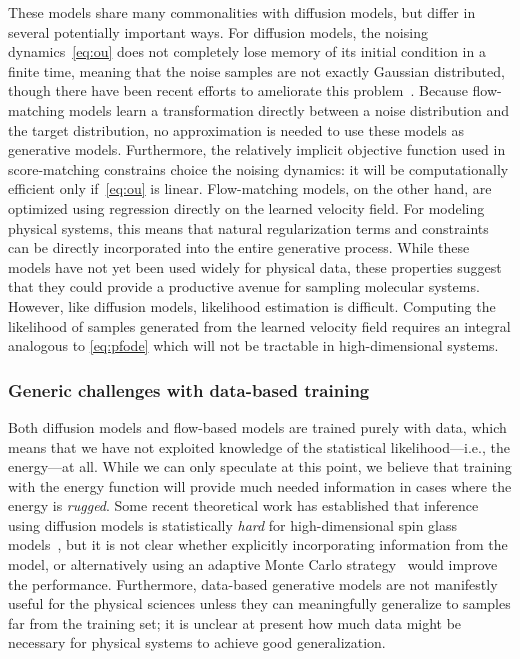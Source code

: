 \documentclass[11pt]{article}
\begin{document}
These models share many commonalities with diffusion models, but differ in several potentially important ways.
For diffusion models, the noising dynamics~\eqref{eq:ou} does not completely lose memory of its initial condition in a finite time, meaning that the noise samples are not exactly Gaussian distributed, though there have been recent efforts to ameliorate this problem~\cite{shi_diffusion_2023}.
Because flow-matching models learn a transformation directly between a noise distribution and the target distribution, no approximation is needed to use these models as generative models. 
Furthermore, the relatively implicit objective function used in score-matching constrains choice the noising dynamics: it will be computationally efficient only if~\eqref{eq:ou} is linear.
Flow-matching models, on the other hand, are optimized using regression directly on the learned velocity field. 
For modeling physical systems, this means that natural regularization terms and constraints can be directly incorporated into the entire generative process. 
While these models have not yet been used widely for physical data, these properties suggest that they could provide a productive avenue for sampling molecular systems. 
However, like diffusion models, likelihood estimation is difficult. 
Computing the likelihood of samples generated from the learned velocity field requires an integral analogous to \eqref{eq:pfode} which will not be tractable in high-dimensional systems.


\subsubsection{Generic challenges with data-based training}

Both diffusion models and flow-based models are trained purely with data, which means that we have not exploited knowledge of the statistical likelihood---i.e., the energy---at all. 
While we can only speculate at this point, we believe that training with the energy function will provide much needed information in cases where the energy is \emph{rugged}.
Some recent theoretical work has established that inference using diffusion models is statistically \emph{hard} for high-dimensional spin glass models~\cite{ghio_sampling_2023}, but it is not clear whether explicitly incorporating information from the model, or alternatively using an adaptive Monte Carlo strategy~\cite{gabrie_efficient_2021, gabrie_adaptive_2022} would improve the performance.
Furthermore, data-based generative models are not manifestly useful for the physical sciences unless they can meaningfully generalize to samples far from the training set; it is unclear at present how much data might be necessary for physical systems to achieve good generalization.
\end{document}
